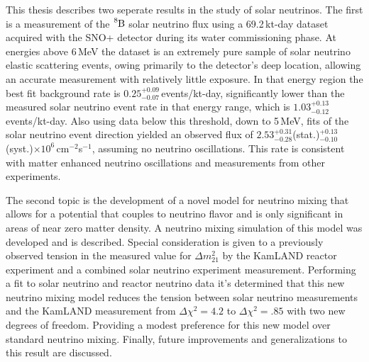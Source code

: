 

\begin{abstracts}
    This thesis describes two seperate results in the study of solar neutrinos.
    The first is
    a measurement of the $\ce{^{8}B}$ solar neutrino flux using a
    69.2\,kt-day dataset acquired with the
    SNO+ detector during its water
    commissioning phase.
    At energies above 6\,MeV the dataset is an extremely
    pure sample of solar neutrino elastic scattering events, owing primarily to
    the detector's deep location, allowing
    an accurate measurement with relatively little exposure. In that energy
    region the best fit background rate is
    $0.25^{+0.09}_{-0.07}$\,events/kt-day, significantly
    lower than the measured solar neutrino event rate in that energy range,
    which is $1.03^{+0.13}_{-0.12}$\,events/kt-day. Also using data below this threshold, down
    to 5\,MeV, fits of the solar neutrino event direction yielded an observed
    flux of
    $2.53^{+0.31}_{-0.28}$(stat.)$^{+0.13}_{-0.10}$(syst.)$\times10^6$\,cm$^{-2}$s$^{-1}$,
    assuming no neutrino oscillations. This rate is
    consistent with matter enhanced neutrino oscillations and measurements from
    other experiments.

    The second topic is the development of a novel model for neutrino mixing
    that allows for a potential that couples to neutrino
    flavor and is only significant in areas of near zero matter density.
    A neutrino mixing simulation of this model was developed and is described.
    Special consideration
    is given to a previously observed tension in the measured value
    for $\Delta m^{2}_{21}$ by the KamLAND reactor experiment and
    a combined solar neutrino experiment measurement.
    Performing a fit to solar neutrino and reactor neutrino
    data it's determined that this new neutrino mixing model reduces the tension
    between solar neutrino measurements and the KamLAND measurement
    from $\Delta \chi^{2}=4.2$ to $\Delta \chi^{2}=.85$ with
    two new degrees of freedom.
    Providing a modest preference for this new model over standard neutrino mixing.
    Finally, future improvements and generalizations to this result are discussed.
\end{abstracts}

